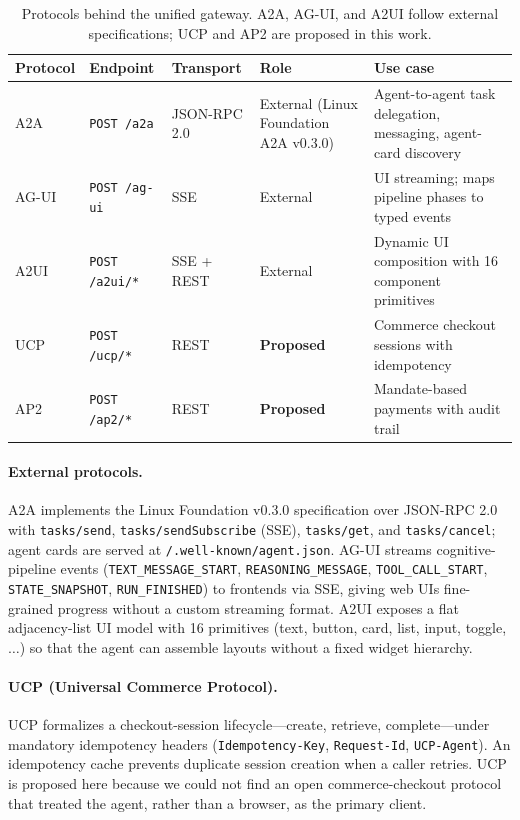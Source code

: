 \documentclass[11pt]{article}
\begin{document}
\begin{table}[t]
  \small
  \centering
  \begin{tabular}{llllp{5.5cm}}
    \toprule
    Protocol & Endpoint & Transport & Role & Use case \\
    \midrule
    A2A  & \texttt{POST /a2a}          & JSON-RPC 2.0 & External (Linux Foundation A2A v0.3.0) & Agent-to-agent task delegation, messaging, agent-card discovery \\
    AG-UI & \texttt{POST /ag-ui}        & SSE           & External             & UI streaming; maps pipeline phases to typed events \\
    A2UI & \texttt{POST /a2ui/*}       & SSE + REST    & External             & Dynamic UI composition with 16 component primitives \\
    UCP  & \texttt{POST /ucp/*}        & REST          & \textbf{Proposed}    & Commerce checkout sessions with idempotency \\
    AP2  & \texttt{POST /ap2/*}        & REST          & \textbf{Proposed}    & Mandate-based payments with audit trail \\
    \bottomrule
  \end{tabular}
  \caption{Protocols behind the unified gateway. A2A, AG-UI, and A2UI follow external specifications; UCP and AP2 are proposed in this work.}
  \label{tab:protocols}
\end{table}

\paragraph{External protocols.} A2A implements the Linux Foundation v0.3.0 specification over JSON-RPC 2.0 with \texttt{tasks/send}, \texttt{tasks/sendSubscribe} (SSE), \texttt{tasks/get}, and \texttt{tasks/cancel}; agent cards are served at \texttt{/.well-known/agent.json}. AG-UI streams cognitive-pipeline events (\texttt{TEXT\_MESSAGE\_START}, \texttt{REASONING\_MESSAGE}, \texttt{TOOL\_CALL\_START}, \texttt{STATE\_SNAPSHOT}, \texttt{RUN\_FINISHED}) to frontends via SSE, giving web UIs fine-grained progress without a custom streaming format. A2UI exposes a flat adjacency-list UI model with 16 primitives (text, button, card, list, input, toggle, $\ldots$) so that the agent can assemble layouts without a fixed widget hierarchy.

\paragraph{UCP (Universal Commerce Protocol).} UCP formalizes a checkout-session lifecycle---create, retrieve, complete---under mandatory idempotency headers (\texttt{Idempotency-Key}, \texttt{Request-Id}, \texttt{UCP-Agent}). An idempotency cache prevents duplicate session creation when a caller retries. UCP is proposed here because we could not find an open commerce-checkout protocol that treated the agent, rather than a browser, as the primary client.
\end{document}
